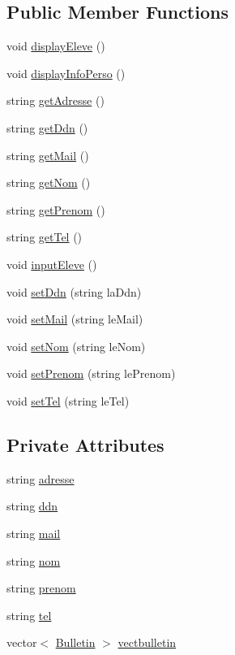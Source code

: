 \subsection*{Public Member Functions}
\begin{DoxyCompactItemize}
\item 
void \hyperlink{classEleve_a3439cb2d4026c53c6969ca8151486781}{display\+Eleve} ()
\item 
void \hyperlink{classEleve_ab1f4ee4e520da153c7ba8c22acad446e}{display\+Info\+Perso} ()
\item 
string \hyperlink{classEleve_ab88c2938b0b20c6e4d0d7ed7df5213ae}{get\+Adresse} ()
\item 
string \hyperlink{classEleve_a9fc13a5e7e17eed186b020f5a7c5c7e1}{get\+Ddn} ()
\item 
string \hyperlink{classEleve_a6ac1b907ce074332f3b6511a9ccd5e91}{get\+Mail} ()
\item 
string \hyperlink{classEleve_a93bee6f886a1df2f319999327d303fbc}{get\+Nom} ()
\item 
string \hyperlink{classEleve_a5a26cc9d114f649de17b7a8c10fc33a7}{get\+Prenom} ()
\item 
string \hyperlink{classEleve_a632895c687695dab68fde3a9fbc63b5b}{get\+Tel} ()
\item 
void \hyperlink{classEleve_a266545436450b92a4c3197af7e58ec72}{input\+Eleve} ()
\item 
void \hyperlink{classEleve_a050278d9dc18ea369b0d92b7cd1c770d}{set\+Ddn} (string la\+Ddn)
\item 
void \hyperlink{classEleve_aaf72558b8ffdb9b712fca6c3ba2ee513}{set\+Mail} (string le\+Mail)
\item 
void \hyperlink{classEleve_ab57f4048c565ee7f5d6e0a982984e5aa}{set\+Nom} (string le\+Nom)
\item 
void \hyperlink{classEleve_a97d4a0717cae6c0ce9ec5964de6ba7cb}{set\+Prenom} (string le\+Prenom)
\item 
void \hyperlink{classEleve_a29e025c2288a638f1e6d8a33c8dbc4b1}{set\+Tel} (string le\+Tel)
\end{DoxyCompactItemize}
\subsection*{Private Attributes}
\begin{DoxyCompactItemize}
\item 
string \hyperlink{classEleve_a14f872fc950333bc99e8fbe114aa61a1}{adresse}
\item 
string \hyperlink{classEleve_aef927bb2f0e5cb17c6b561a6c36ee5cd}{ddn}
\item 
string \hyperlink{classEleve_a265105fe7abcb70d0eec06f251ddd1b9}{mail}
\item 
string \hyperlink{classEleve_a9d2382d2839a53d9cb3d77f1712a7f74}{nom}
\item 
string \hyperlink{classEleve_a2fa7f2d2346b55554e45563b80ed1065}{prenom}
\item 
string \hyperlink{classEleve_a83fe46bb36be495f70937ef3181f71e0}{tel}
\item 
vector$<$ \hyperlink{classBulletin}{Bulletin} $>$ \hyperlink{classEleve_ae77c6b6b9a488e85b2a45f86ae0686ab}{vectbulletin}
\end{DoxyCompactItemize}


